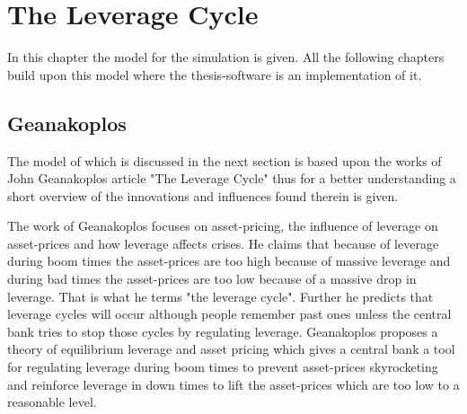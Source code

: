 \documentclass[../Bachelorarbeit.tex]{subfiles}
\begin{document}
\chapter{The Leverage Cycle}
\label{ch:leverageCycle}

In this chapter the model for the simulation is given. All the following chapters build upon this model where the thesis-software is an implementation of it. 

\section{Geanakoplos}
The model of \cite{Breuer2015} which is discussed in the next section is based upon the works of John Geanakoplos article \cite{Geanakoplos2009} "The Leverage Cycle" thus for a better understanding a short overview of the innovations and influences found therein is given.

\medskip

The work of Geanakoplos focuses on asset-pricing, the influence of leverage on asset-prices and how leverage affects crises. He claims that because of leverage during boom times the asset-prices are too high because of massive leverage and during bad times the asset-prices are too low because of a massive drop in leverage. That is what he terms "the leverage cycle". Further he predicts that leverage cycles will occur although people remember past ones unless the central bank tries to stop those cycles by regulating leverage. Geanakoplos proposes a theory of equilibrium leverage and asset pricing which gives a central bank a tool for regulating leverage during boom times to prevent asset-prices skyrocketing and reinforce leverage in down times to lift the asset-prices which are too low to a reasonable level.

\medskip
\end{document}

